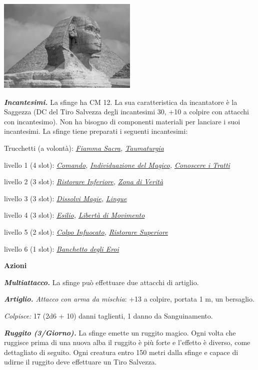\begin{multicols}{2}
{\begin{center}
	\includegraphics[width=0.5\textwidth]{immagini/ginosfinge.png}
\end{center}


\emph{\textbf{Incantesimi.}} La sfinge ha CM 12.
La sua caratteristica da incantatore è la Saggezza (DC del Tiro Salvezza degli incantesimi 30, +10 a colpire con attacchi con incantesimo). Non ha bisogno di componenti materiali per lanciare i suoi incantesimi. La sfinge tiene preparati i seguenti incantesimi:

Trucchetti (a volontà): \emph{\hyperlink{Fiamma Sacra}{Fiamma Sacra}, \hyperlink{Taumaturgia}{Taumaturgia}}

livello 1 (4 slot): \emph{\hyperlink{Comando}{Comando}, \hyperlink{Individuazione del Magico}{Individuazione del Magico}, \hyperlink{Conoscere i Tratti}{Conoscere i Tratti}}

livello 2 (3 slot): \emph{\hyperlink{Ristorare Inferiore}{Ristorare Inferiore}, \hyperlink{Zona di Verità}{Zona di Verità}}

livello 3 (3 slot): \emph{\hyperlink{Dissolvi Magie}{Dissolvi Magie}, \hyperlink{Lingue}{Lingue}}

livello 4 (3 slot): \emph{\hyperlink{Esilio}{Esilio}, \hyperlink{Libertà di Movimento}{Libertà di Movimento}}

livello 5 (2 slot): \emph{\hyperlink{Colpo Infuocato}{Colpo Infuocato}, \hyperlink{Ristorare Superiore}{Ristorare Superiore}}

livello 6 (1 slot): \emph{\hyperlink{Banchetto degli Eroi}{Banchetto degli Eroi}}

\textbf{Azioni}

\emph{\textbf{Multiattacco.}} La sfinge può effettuare due attacchi di artiglio.

\emph{\textbf{Artiglio.} Attacco con arma da mischia}: +13 a colpire, portata 1 m, un bersaglio.

\emph{Colpisce:} 17 (2d6 + 10) danni taglienti, 1 danno da Sanguinamento.

\emph{\textbf{Ruggito (3/Giorno).}} La sfinge emette un ruggito magico. Ogni volta che ruggisce prima di una nuova alba il ruggito è più forte e l'effetto è diverso, come dettagliato di seguito. Ogni creatura entro 150 metri dalla sfinge e capace di udirne il ruggito deve effettuare un Tiro Salvezza.

}
\end{multicols}
